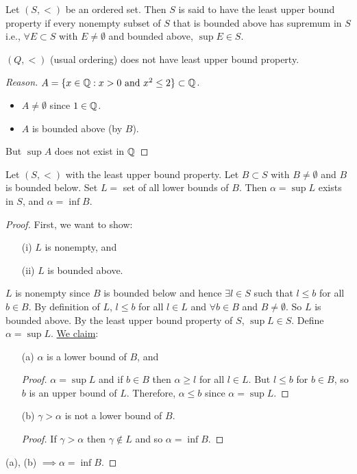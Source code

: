 \documentclass[]{article}
\begin{document}
\begin{definition}
	 Let $(S,<)$ be an ordered set. Then $S$ is said to have the least upper bound property if every nonempty subset of $S$ that is bounded above has supremum in $S$ i.e., $\forall E\subset S$ with $E\neq \emptyset$ and bounded above, $\sup E \in S$.
\end{definition}
\begin{example}
	$(Q,<)$ (usual ordering) does not have least upper bound property.
	
	\begin{proof}
		[Reason] $A = \{x\in\mathbb{Q}: x>0 \text{ and } x^2\leq 2\}\subset \mathbb{Q}$. 
		\begin{itemize}
			\item $A\neq\emptyset$ since $1\in \mathbb{Q}$.
			\item $A$ is bounded above (by $B$).
		\end{itemize}
		But $\sup A$ does not exist in $\mathbb{Q}$
	\end{proof}
\end{example}

\begin{theorem}
	Let $(S,<)$ with the least upper bound property. Let $B\subset S$ with $B\neq \emptyset$ and $B$ is bounded below.
	Set $L = $ set of all lower bounds of $B$. Then $\alpha = \sup L$ exists in $S$, and $\alpha = \inf B$.
	\begin{proof}
		First, we want to show:
		\begin{enumerate}
			\item[(i)] $L$ is nonempty, and
			\item[(ii)] $L$ is bounded above.
		\end{enumerate}
		$L$ is nonempty since $B$ is bounded below and hence $\exists l\in S$ such that $l\leq b$ for all $b\in B$. By definition of $L$, $l \leq b$ for all $l\in L$ and $\forall b\in B$ and $B\neq\emptyset$. So $L$ is bounded above.
		By the least upper bound property of $S$, $\sup L\in S$. Define $\alpha = \sup L$. \ul{We claim}:
		\begin{enumerate}
			\item[(a)] $\alpha$ is a lower bound of $B$, and
			\begin{proof}
				$\alpha = \sup L$ and if $b\in B$ then $\alpha \geq l$ for all $l\in L$. But $l\leq b$ for $b\in B$, so $b$ is an upper bound of $L$. Therefore, $\alpha \leq b$ since $\alpha = \sup L$.
			\end{proof}
			\item[(b)] $\gamma>\alpha$ is not a lower bound of $B$.
			\begin{proof}
				If $\gamma > \alpha$ then $\gamma \notin L$ and so $\alpha = \inf B$.
			\end{proof}
		\end{enumerate}
		(a), (b) $\implies \alpha = \inf B$.
		
	\end{proof}
\end{theorem}
\end{document}
